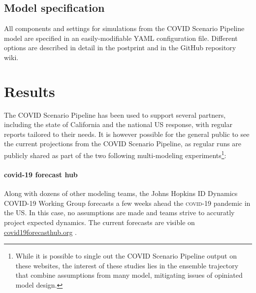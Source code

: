 {\subsection{Model specification}
All components and settings for simulations from the COVID  Scenario Pipeline model are specified in an easily-modifiable YAML configuration file. Different options are described in detail in the postprint and in the GitHub repository wiki.

\section{Results}
The COVID Scenario Pipeline has been used to support several partners, including the state of California and the national US response, with regular reports tailored to their needs. It is however possible for the general public to see the current projections from the COVID Scenario Pipeline, as regular runs are publicly shared as part of the two following multi-modeling experiments\footnote{While it is possible to single out the COVID Scenario Pipeline output on these websites, the interest of these studies lies in the ensemble trajectory that combine assumptions from many model, mitigating issues of opiniated model design.}:

\paragraph{covid-19 forecast hub} Along with dozens of other modeling teams, the Johns Hopkins ID Dynamics COVID-19 Working Group forecasts a few weeks ahead the \textsc{covid}-19 pandemic in the US. In this case, no assumptions are made and teams strive to accuratly project expected dynamics. The current forecasts are visible on \url{covid19forecasthub.org} \cite{Cramer:EvaluationIndividualEnsemble:2021}.

}
